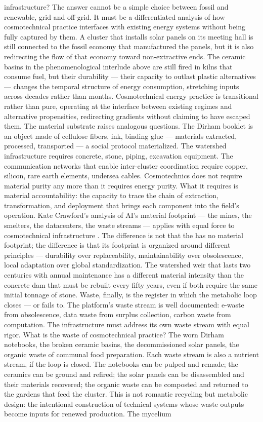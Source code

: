 infrastructure? The answer cannot be a simple choice between fossil and renewable, grid and off-grid. It must be a differentiated analysis of how cosmotechnical practice interfaces with existing energy systems without being fully captured by them. A cluster that installs solar panels on its meeting hall is still connected to the fossil economy that manufactured the panels, but it is also redirecting the flow of that economy toward non-extractive ends. The ceramic basins in the phenomenological interlude above are still fired in kilns that consume fuel, but their durability — their capacity to outlast plastic alternatives — changes the temporal structure of energy consumption, stretching inputs across decades rather than months. Cosmotechnical energy practice is transitional rather than pure, operating at the interface between existing regimes and alternative propensities, redirecting gradients without claiming to have escaped them. The material substrate raises analogous questions. The Dirham booklet is an object made of cellulose fibers, ink, binding glue — materials extracted, processed, transported — a social protocol materialized. The watershed infrastructure requires concrete, stone, piping, excavation equipment. The communication networks that enable inter-cluster coordination require copper, silicon, rare earth elements, undersea cables. Cosmotechnics does not require material purity any more than it requires energy purity. What it requires is material accountability: the capacity to trace the chain of extraction, transformation, and deployment that brings each component into the field’s operation. Kate Crawford’s analysis of AI’s material footprint — the mines, the smelters, the datacenters, the waste streams — applies with equal force to cosmotechnical infrastructure \cite{crawford_2021}. The difference is not that the  has no material footprint; the difference is that its footprint is organized around different principles — durability over replaceability, maintainability over obsolescence, local adaptation over global standardization. The watershed weir that lasts two centuries with annual maintenance has a different material intensity than the concrete dam that must be rebuilt every fifty years, even if both require the same initial tonnage of stone. Waste, finally, is the register in which the metabolic loop closes — or fails to. The platform’s waste stream is well documented: e-waste from obsolescence, data waste from surplus collection, carbon waste from computation. The  infrastructure must address its own waste stream with equal rigor. What is the waste of cosmotechnical practice? The worn Dirham notebooks, the broken ceramic basins, the decommissioned solar panels, the organic waste of communal food preparation. Each waste stream is also a nutrient stream, if the loop is closed. The notebooks can be pulped and remade; the ceramics can be ground and refired; the solar panels can be disassembled and their materials recovered; the organic waste can be composted and returned to the gardens that feed the cluster. This is not romantic recycling but metabolic design: the intentional construction of technical systems whose waste outputs become inputs for renewed production. The mycelium 